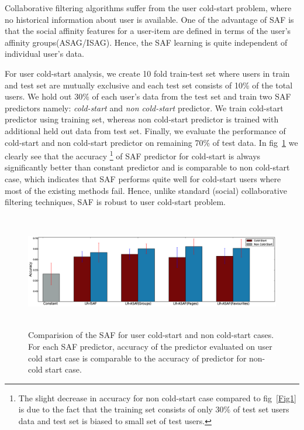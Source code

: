 Collaborative filtering algorithms suffer from the user cold-start problem,
where no historical information about user is available. One of the advantage of SAF is that 
the social affinity features for a user-item are defined in terms of the user's affinity groups(ASAG/ISAG).
Hence, the SAF learning is quite independent of individual user's data. 

For user cold-start analysis, we create 10 fold train-test set where users in train and test set are mutually exclusive
and each test set consists of 10\% of the total users. We hold out 30\% of each user's data from the test set 
and train two SAF predictors namely: \textit{cold-start} and \textit{non cold-start} predictor.
We train cold-start predictor using training set, whereas non cold-start predictor is trained with additional 
held out data from test set. Finally, we evaluate the performance of cold-start and non cold-start predictor on remaining 70\% 
of test data. In fig~\ref{fig:coldstart} we clearly see that the accuracy \footnote{ The slight decrease in accuracy for non cold-start case compared to 
fig~\ref{Fig1} is due to the fact that the training set consists of only 30\% of test set users data and test 
set is biased to small set of test users.} of  SAF predictor for cold-start is always significantly better than constant predictor and is comparable
to non cold-start case, which indicates that SAF performs quite well for cold-start users where most of the
existing methods fail.  Hence, unlike standard (social) collaborative filtering techniques, SAF is robust to user 
cold-start problem.  


\begin{figure}[tbp!]
\centering
\includegraphics[width=180mm,height=50mm]{data/plots/new/cold_start.eps}
\vspace{-3mm}
\caption{Comparision of the SAF for user cold-start and non cold-start cases.
For each SAF predictor, accuracy of the predictor evaluated on user
cold start case is comparable to the accuracy of predictor for non-cold start case.}
\label{fig:coldstart}
\end{figure}
 
